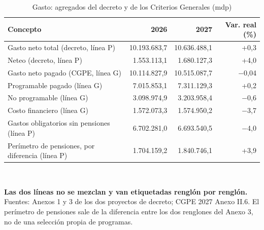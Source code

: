 \begin{table}[htbp]\centering\small
\caption{Gasto: agregados del decreto y de los Criterios Generales (mdp)}\label{cua:gasto}
\begin{tabular}{lrrr}
\toprule
Concepto & 2026 & 2027 & Var. real (\%) \\
\midrule
Gasto neto total (decreto, línea P) & 10.193.683,7 & 10.636.488,1 & +0,3 \\
Neteo (decreto, línea P) & 1.553.113,1 & 1.680.127,3 & +4,0 \\
Gasto neto pagado (CGPE, línea G) & 10.114.827,9 & 10.515.087,7 & $-$0,04 \\
\quad Programable pagado (línea G) & 7.015.853,1 & 7.311.129,3 & +0,2 \\
\quad No programable (línea G) & 3.098.974,9 & 3.203.958,4 & $-$0,6 \\
\quad\quad Costo financiero (línea G) & 1.572.073,3 & 1.574.950,2 & $-$3,7 \\
Gastos obligatorios sin pensiones (línea P) & 6.702.281,0 & 6.693.540,5 & $-$4,0 \\
Perímetro de pensiones, por diferencia (línea P) & 1.704.159,2 & 1.840.746,1 & +3,9 \\
\bottomrule
\end{tabular}
\\[2pt]\begin{minipage}{0.92\textwidth}\scriptsize \textbf{Las dos líneas no se mezclan y van etiquetadas renglón por renglón.} Fuentes: Anexos 1 y 3 de los dos proyectos de decreto; CGPE 2027 Anexo II.6. El perímetro de pensiones sale de la diferencia entre los dos renglones del Anexo 3, no de una selección propia de programas.\end{minipage}
\end{table}
